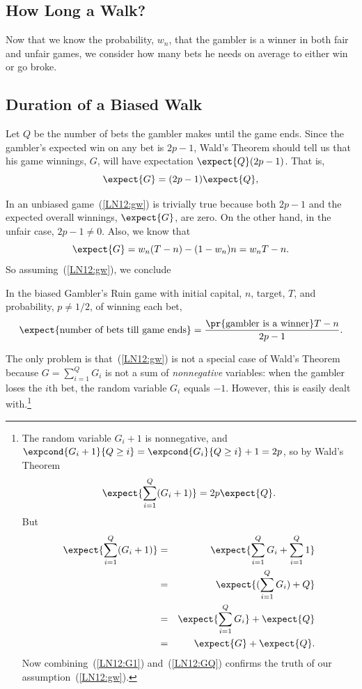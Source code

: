 \begin{example}
\subsection{How Long a Walk?}

Now that we know the probability, $w_n$, that the gambler is a winner in
both fair and unfair games, we consider how many bets he needs on average
to either win or go broke.

\subsection{Duration of a Biased Walk}

Let $Q$ be the number of bets the gambler makes until the game ends.  Since
the gambler's expected win on any bet is $2p-1$, Wald's Theorem should tell
us that his game winnings, $G$, will have expectation $\expect{Q}(2p-1)$.
That is,
\begin{equation}\label{LN12:gw}
\expect{G} = (2p-1)\expect{Q},
\end{equation}

In an unbiased game~(\ref{LN12:gw}) is trivially true because both $2p-1$ and
the expected overall winnings, $\expect{G}$, are zero.  On the other hand,
in the unfair case, $2p-1 \neq 0$.  Also, we know that
\[
\expect{G} = w_n(T-n) - (1-w_n)n = w_nT-n.
\]
So assuming~(\ref{LN12:gw}), we conclude
\begin{theorem}\label{LN12:ExQthm}
In the biased Gambler's Ruin game with initial capital, $n$, target,
$T$, and probability, $p \neq 1/2$, of winning each bet,
\begin{equation}\label{LN12:ExQ}
\expect{\text{number of bets till game ends}} =
\frac{\pr{\text{gambler is a winner}}T-n}{2p-1}.
\end{equation}
\end{theorem}

The only problem is that~(\ref{LN12:gw}) is not a special case of Wald's
Theorem because $G = \sum_{i=1}^Q G_i$ is not a sum of \emph{nonnegative}
variables: when the gambler loses the $i$th bet, the random variable $G_i$
equals $-1$.  However, this is easily dealt with.\footnote{The random variable
$G_i+1$ is nonnegative, and $\expcond{G_i+1}{Q \geq i} =
\expcond{G_i}{Q\geq i}+1 = 2p$, so by Wald's Theorem
\begin{equation}\label{LN12:G1}
\expect{\sum_{i=1}^Q (G_i+1)}  = 2p\expect{Q}.
\end{equation}
But
\begin{eqnarray}
\expect{\sum_{i=1}^Q (G_i+1)} & = & \expect{\sum_{i=1}^Q G_i + \sum_{i=1}^Q 1}\notag\\
   & = & \expect{(\sum_{i=1}^Q G_i) + Q}\notag\\
   & = & \expect{\sum_{i=1}^Q G_i} + \expect{Q}\notag\\
   & = & \expect{G} + \expect{Q}\label{LN12:GQ}.
\end{eqnarray}
Now combining~(\ref{LN12:G1}) and~(\ref{LN12:GQ}) confirms the truth of our
assumption~(\ref{LN12:gw}).}


\end{example}
